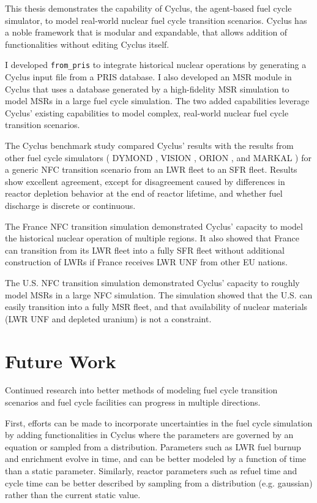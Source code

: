 This thesis demonstrates the capability of Cyclus, the agent-based
fuel cycle simulator, to model real-world nuclear fuel cycle
transition scenarios. Cyclus has a noble framework that is
modular and expandable, that allows addition of functionalities
without editing Cyclus itself.

I developed \texttt{from\_pris}
to integrate historical nuclear operations by generating
a Cyclus input file from a \gls{PRIS} database. I also
developed an \gls{MSR} module in Cyclus that uses a database
generated by a high-fidelity \gls{MSR} simulation to model
\glspl{MSR} in a large fuel cycle simulation. The two
added capabilities leverage Cyclus' existing capabilities
to model complex, real-world nuclear fuel cycle transition
scenarios.

The Cyclus benchmark study compared Cyclus' results with
the results from other fuel cycle simulators
(
DYMOND \cite{yacout_modeling_2005},
VISION \cite{jacobson_verifiable_2010},
ORION \cite{gregg_analysis_2012}, and
MARKAL \cite{shay_epa_2006}
) for a generic \gls{NFC} transition scenario from an
\gls{LWR} fleet to an \gls{SFR} fleet. Results show
excellent agreement, except for disagreement caused 
by differences in reactor depletion
behavior at the end of reactor lifetime, and
whether fuel discharge is discrete or continuous.

The France \gls{NFC} transition simulation demonstrated
Cyclus' capacity to model the historical nuclear operation
of multiple regions. It also showed that
France can transition from its \gls{LWR} fleet into a fully \gls{SFR} fleet
without additional construction of \glspl{LWR} if France receives
\gls{LWR} \gls{UNF} from other \gls{EU} nations.

The U.S. \gls{NFC} transition simulation demonstrated
Cyclus' capacity to roughly model \glspl{MSR} in
a large \gls{NFC} simulation. The simulation showed
that the U.S. can easily transition into a fully
\gls{MSR} fleet, and that availability of nuclear materials
(\gls{LWR} \gls{UNF} and depleted uranium) is not a constraint.



\section{Future Work}
Continued research into better methods of modeling fuel cycle
transition scenarios and fuel cycle facilities can progress
in multiple directions. 

First, efforts can be made to incorporate
uncertainties in the fuel cycle simulation by adding functionalities
in Cyclus where the parameters are governed by an equation
or sampled from a distribution. Parameters such as \gls{LWR} fuel
burnup and enrichment evolve in time, and can be better modeled
by a function of time than a static parameter. Similarly, reactor parameters
such as refuel time and cycle time can be better described by sampling
from a distribution (e.g. gaussian) rather than the current static
value.

